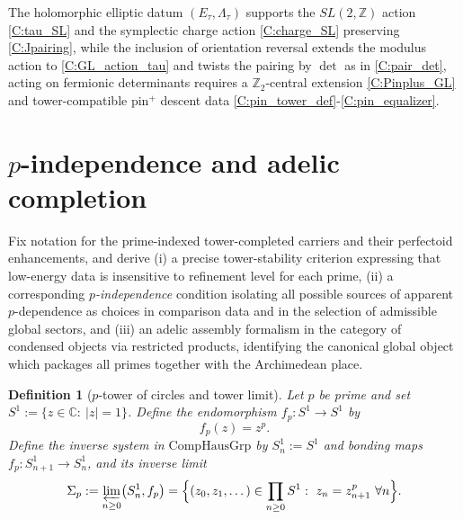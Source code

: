 \documentclass[11pt]{article}
\newtheorem{definition}[theorem]{Definition}
\theoremstyle{remark}
\begin{document}
The holomorphic elliptic datum $(E_{\tau},\Lambda_{\tau})$ supports the $SL(2,\mathbb Z)$ action \eqref{C:tau_SL} and the symplectic charge action \eqref{C:charge_SL} preserving \eqref{C:Jpairing}, while the inclusion of orientation reversal extends the modulus action to \eqref{C:GL_action_tau} and twists the pairing by $\det$ as in \eqref{C:pair_det}, acting on fermionic determinants requires a $\mathbb Z_{2}$-central extension \eqref{C:Pinplus_GL} and tower-compatible pin$^{+}$ descent data \eqref{C:pin_tower_def}-\eqref{C:pin_equalizer}.



{%
\section{\texorpdfstring{$p$}{p}-independence and adelic completion}
\label{app:p-independence-adelic} 
Fix notation for the prime-indexed tower-completed carriers and their perfectoid enhancements, and derive (i) a precise tower-stability criterion expressing that low-energy data is insensitive to refinement level for each prime, (ii) a corresponding \emph{$p$-independence} condition isolating all possible sources of apparent $p$-dependence as choices in comparison data and in the selection of admissible global sectors, and (iii) an adelic assembly formalism in the category of condensed objects via restricted products, identifying the canonical global object which packages all primes together with the Archimedean place.

\begin{definition}[$p$-tower of circles and tower limit]\label{D:def:tower_circle}
Let $p$ be prime and set $S^{1}:=\{z\in\mathbb C:\ |z|=1\}$.
Define the endomorphism $f_{p}:S^{1}\to S^{1}$ by
\begin{equation}
f_{p}(z)=z^{p}.
\label{D:eq:fp}
\end{equation}
Define the inverse system in $\mathrm{CompHausGrp}$ by $S^{1}_{n}:=S^{1}$ and bonding maps $f_{p}:S^{1}_{n+1}\to S^{1}_{n}$, and its inverse limit
\begin{equation}
\Sigma_{p}:=\varprojlim_{n\ge 0}\bigl(S^{1}_{n},f_{p}\bigr)
=
\Bigl\{(z_{0},z_{1},\dots)\in\prod_{n\ge 0}S^{1}:\ z_{n}=z_{n+1}^{p}\ \forall n\Bigr\}.
\label{D:eq:Sigma_p}
\end{equation}
\end{definition}

}
\end{document}
